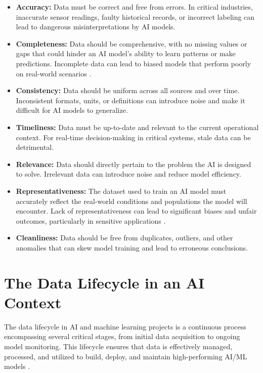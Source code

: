 \begin{itemize}
    \item \textbf{Accuracy:} Data must be correct and free from errors. In critical industries, inaccurate sensor readings, faulty historical records, or incorrect labeling can lead to dangerous misinterpretations by AI models.
    \item \textbf{Completeness:} Data should be comprehensive, with no missing values or gaps that could hinder an AI model's ability to learn patterns or make predictions. Incomplete data can lead to biased models that perform poorly on real-world scenarios \parencite{Wang2019}.
    \item \textbf{Consistency:} Data should be uniform across all sources and over time. Inconsistent formats, units, or definitions can introduce noise and make it difficult for AI models to generalize.
    \item \textbf{Timeliness:} Data must be up-to-date and relevant to the current operational context. For real-time decision-making in critical systems, stale data can be detrimental.
    \item \textbf{Relevance:} Data should directly pertain to the problem the AI is designed to solve. Irrelevant data can introduce noise and reduce model efficiency.
    \item \textbf{Representativeness:} The dataset used to train an AI model must accurately reflect the real-world conditions and populations the model will encounter. Lack of representativeness can lead to significant biases and unfair outcomes, particularly in sensitive applications \parencite{Buolamwini2018}.
    \item \textbf{Cleanliness:} Data should be free from duplicates, outliers, and other anomalies that can skew model training and lead to erroneous conclusions.
\end{itemize}

\section{The Data Lifecycle in an AI Context}
\label{sec:data_lifecycle}
The data lifecycle in AI and machine learning projects is a continuous process encompassing several critical stages, from initial data acquisition to ongoing model monitoring. This lifecycle ensures that data is effectively managed, processed, and utilized to build, deploy, and maintain high-performing AI/ML models \parencite{Milvus2023}.

